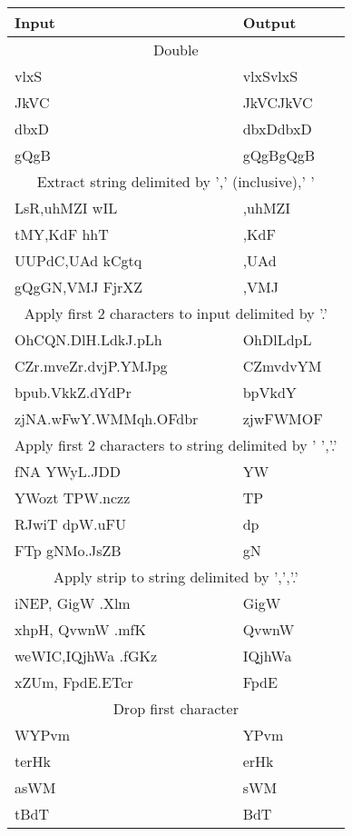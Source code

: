 \documentclass{article}
\begin{document}
\begin{center}
\begin{tabular}{|l|l|}
  \hline Input&Output\\
  \hline\multicolumn{2}{|c|}{Double}\\
  \hline
vlxS & vlxSvlxS \\
 JkVC & JkVCJkVC \\
 dbxD & dbxDdbxD \\
 gQgB & gQgBgQgB \\
  \hline\multicolumn{2}{|c|}{Extract string delimited by ',' (inclusive),' '}\\
  \hline
LsR,uhMZI wIL & ,uhMZI  \\
 tMY,KdF hhT & ,KdF  \\
 UUPdC,UAd kCgtq & ,UAd  \\
 gQgGN,VMJ FjrXZ & ,VMJ \\
  \hline\multicolumn{2}{|c|}{Apply first 2 characters to input delimited by '.'}\\
  \hline
OhCQN.DlH.LdkJ.pLh & OhDlLdpL \\
 CZr.mveZr.dvjP.YMJpg & CZmvdvYM \\
 bpub.VkkZ.dYdPr & bpVkdY \\
 zjNA.wFwY.WMMqh.OFdbr & zjwFWMOF \\
  \hline\multicolumn{2}{|c|}{Apply first 2 characters to string delimited by ' ','.'}\\
  \hline
fNA YWyL.JDD & YW \\
 YWozt TPW.nczz & TP \\
 RJwiT dpW.uFU & dp \\
 FTp gNMo.JsZB & gN \\
  \hline\multicolumn{2}{|c|}{Apply strip to string delimited by ',','.'}\\
  \hline
iNEP,  GigW .Xlm & GigW \\
 xhpH,  QvwnW .mfK & QvwnW \\
 weWIC,IQjhWa .fGKz & IQjhWa \\
 xZUm, FpdE.ETcr & FpdE \\
  \hline\multicolumn{2}{|c|}{Drop first character}\\
  \hline
WYPvm & YPvm \\
 terHk & erHk \\
 asWM & sWM \\
 tBdT & BdT \\
\hline
\end{tabular}
\end{center}
\end{document}
